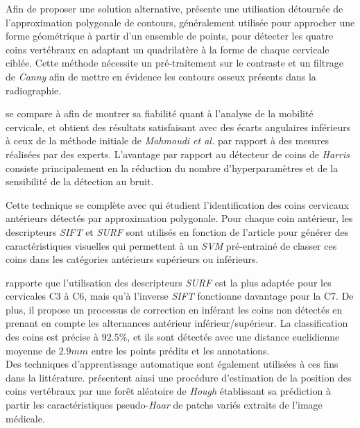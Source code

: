        Afin de proposer une solution alternative, \cite{Lecron2010} présente une utilisation détournée de l'approximation polygonale de contours, généralement utilisée pour approcher une forme géométrique à partir d'un ensemble de points, pour détecter les quatre coins vertébraux en adaptant un quadrilatère à la forme de chaque cervicale ciblée. Cette méthode nécessite un pré-traitement sur le contraste et un filtrage de {\itshape Canny} afin de mettre en évidence les contours osseux présents dans la radiographie.

        \cite{Lecron2010} se compare à \cite{Mahmoudi2007} afin de montrer sa fiabilité quant à l'analyse de la mobilité cervicale, et obtient des résultats satisfaisant avec des écarts angulaires inférieurs à ceux de la méthode initiale de {\itshape Mahmoudi et al.} par rapport à des mesures réalisées par des experts. L'avantage par rapport au détecteur de coins de {\itshape Harris} consiste principalement en la réduction du nombre d'hyperparamètres et de la sensibilité de la détection au bruit.

        Cette technique se complète avec \cite{Lecron2012b, Lecron2012c} qui étudient l'identification des coins cervicaux antérieurs détectés par approximation polygonale. Pour chaque coin antérieur, les descripteurs {\itshape SIFT} et {\itshape SURF} sont utilisés en fonction de l'article pour générer des caractéristiques visuelles qui permettent à un {\itshape SVM} pré-entrainé de classer ces coins dans les catégories antérieurs supérieurs ou inférieurs.

        \cite{Lecron2012a} rapporte que l'utilisation des descripteurs {\itshape SURF} est la plus adaptée pour les cervicales C3 à C6, mais qu'à l'inverse {\itshape SIFT} fonctionne davantage pour la C7. De plus, il propose un processus de correction en inférant les coins non détectés en prenant en compte les alternances antérieur inférieur/supérieur. La classification des coins est précise à $92.5\%$, et ils sont détectés avec une distance euclidienne moyenne de $2.9 mm$ entre les points prédits et les annotations.
        \\

        Des techniques d'apprentissage automatique sont également utilisées à ces fins dans la littérature. \cite{AlArif2015a, AlArif2015b} présentent ainsi une procédure d'estimation de la position des coins vertébraux par une forêt aléatoire de {\itshape Hough} établissant sa prédiction à partir les caractéristiques pseudo-\textit{Haar} de patchs variés extraits de l'image médicale.

